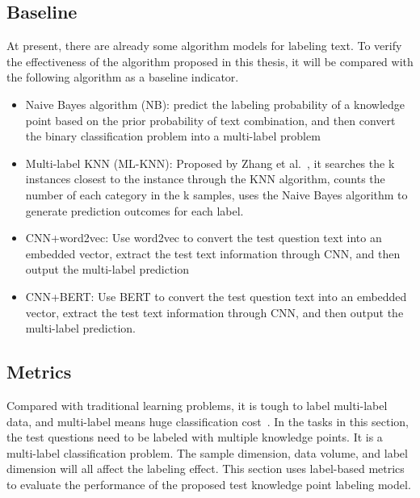 \subsection{Baseline}
At present, there are already some algorithm models for labeling text. To verify the effectiveness of the algorithm proposed in this thesis, it will be compared with the following algorithm as a baseline indicator.
\begin{itemize}
	\item Naive Bayes algorithm (NB): predict the labeling probability of a knowledge point based on the prior probability of text combination, and then convert the binary classification problem into a multi-label problem
	\item Multi-label KNN (ML-KNN): Proposed by Zhang et al.~\cite{zhang2007ml}, it searches the k instances closest to the instance through the KNN algorithm, counts the number of each category in the k samples, uses the Naive Bayes algorithm to generate prediction outcomes for each label.
	\item CNN+word2vec: Use word2vec to convert the test question text into an embedded vector, extract the test text information through CNN, and then output the multi-label prediction
	\item CNN+BERT\@: Use BERT to convert the test question text into an embedded vector, extract the test text information through CNN, and then output the multi-label prediction.
\end{itemize}

\subsection{Metrics}
Compared with traditional learning problems, it is tough to label multi-label data, and multi-label means huge classification cost~\cite{zhang2013review}. In the tasks in this section, the test questions need to be labeled with multiple knowledge points. It is a multi-label classification problem. The sample dimension, data volume, and label dimension will all affect the labeling effect. This section uses label-based metrics to evaluate the performance of the proposed test knowledge point labeling model.

